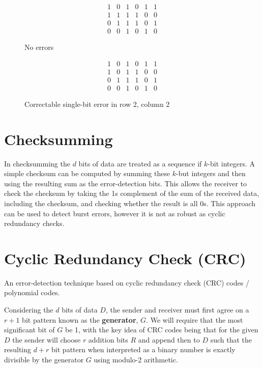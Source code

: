 \documentclass[12pt letter]{report}
\begin{document}
\begin{figure}[H]
  \centering
  \[
    \begin{array}{ccccc|c}
      1 & 0 & 1 & 0 & 1 & 1\\
      1 & 1 & 1 & 1 & 0 & 0\\
      0 & 1 & 1 & 1 & 0& 1 \\
      \hline
      0 & 0 & 1 & 0 & 1 & 0
    \end{array}
  \]
  \caption{No errors}
\end{figure}

\begin{figure}[H]
  \centering
  \[
    \begin{array}{ccccc|c}
      1 & 0 & 1 & 0 & 1 & 1\\
      1 & 0 & 1 & 1 & 0 & 0\\
      0 & 1 & 1 & 1 & 0& 1 \\
      \hline
      0 & 0 & 1 & 0 & 1 & 0
    \end{array}
  \]
  \caption{Correctable single-bit error in row 2, column 2}
\end{figure}


\section{Checksumming}

In checksumming the $d$ bits of data are treated as a sequence if
$k$-bit integers. A simple checksum can be computed by summing these
$k$-but integers and then using the resulting sum as the
error-detection bits. This allows the receiver to check the checksum
by taking the 1s complement of the sum of the received data,
including the checksum, and checking whether the result is all 0s.
This approach can be used to detect burst errors, however it is not
as robust as cyclic redundancy checks.

\section{Cyclic Redundancy Check (CRC)}

An error-detection technique based on cyclic redundancy check (CRC)
codes / polynomial codes.

Considering the $d$ bits of data $D$, the sender and receiver must
first agree on a $r + 1$ bit pattern known as the \textbf{generator},
$G$. We will require that the most significant bit of $G$ be 1, with
the key idea of CRC codes being that for the given $D$ the sender
will choose $r$ addition bits $R$ and append then to $D$ such that
the resulting $d + r$ bit pattern when interpreted as a binary number
is exactly divisible by the generator $G$ using modulo-2 arithmetic.
\end{document}
